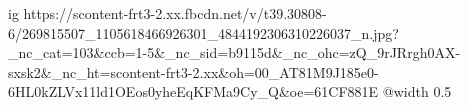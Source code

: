  
 
 
 
 

\ifcmt
  ig https://scontent-frt3-2.xx.fbcdn.net/v/t39.30808-6/269815507_1105618466926301_4844192306310226037_n.jpg?_nc_cat=103&ccb=1-5&_nc_sid=b9115d&_nc_ohc=zQ_9rJRrgh0AX-sxsk2&_nc_ht=scontent-frt3-2.xx&oh=00_AT81M9J185e0-6HL0kZLVx11ld1OEos0yheEqKFMa9Cy_Q&oe=61CF881E
  @width 0.5
\fi

